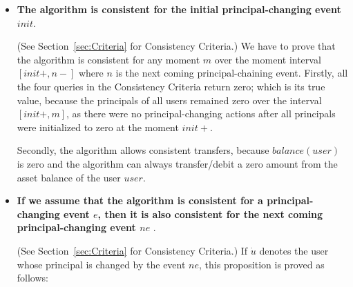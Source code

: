 \documentclass{article}
\begin{document}
\begin{itemize}
  \item \textbf{The algorithm is consistent for the initial principal-changing 
  event $init$}.

  (See Section~\ref{sec:Criteria} for Consistency Criteria.)
  We have to prove that the algorithm is consistent for any moment $m$ over 
  the moment interval $[init+, n-]$ where $n$ is the next coming principal-chaining 
  event.
  Firstly, all the four queries in the Consistency Criteria 
  return zero; which is its true value, because the principals of all users  
  remained zero over the interval $[init+, m]$, as there were no 
  principal-changing actions after all principals were initialized 
  to zero at the moment $init+$.

  Secondly, the algorithm allows consistent transfers, because $balance(user)$ is 
  zero and the algorithm can always transfer/debit a zero amount 
  from the asset balance of the user $user$. 

  \item \textbf{If we assume that the algorithm is consistent for a principal-changing 
  event $e$, then it is also consistent for the next coming principal-changing event $ne$ }.

  (See Section~\ref{sec:Criteria} for Consistency Criteria.) 
  If $\dot u$ denotes the user whose principal is changed by the event $ne$, 
  this proposition is proved as follows:\\

  \begin{itemize}


\end{itemize}
\end{itemize}
\end{document}
